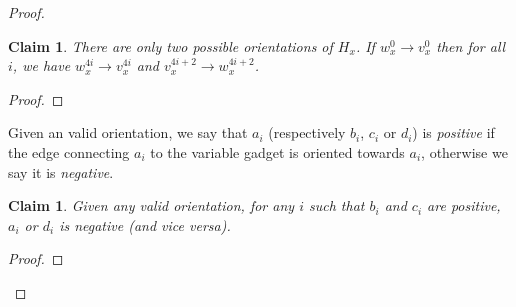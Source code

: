\documentclass[11pt,a4aper]{article}
\newtheorem{claim}[theorem]{Claim}
\begin{document}
\begin{proof}
  \begin{claim}\label{cl:variable_alternating}
    There are only two possible orientations of $H_x$. If $w_x^0 \to v_x^0$ then
    for all $i$, we have $w_x^{4i} \to v_x^{4i}$ and
    $v_x^{4i+2} \to w_x^{4i+2}$.
  \end{claim}
  \begin{proof}
  \end{proof}
  Given an valid orientation, we say that $a_i$ (respectively $b_i$, $c_i$ or
  $d_i$) is \emph{positive} if the edge connecting $a_i$ to the variable gadget
  is oriented towards $a_i$, otherwise we say it is \emph{negative}.
  \begin{claim}
    Given any valid orientation, for any $i$ such that $b_i$ and $c_i$ are
    positive, $a_i$ or $d_i$ is negative (and vice versa).
  \end{claim}

  \begin{proof}
  \end{proof}
\end{proof}

\nocite{*}


\end{document}
